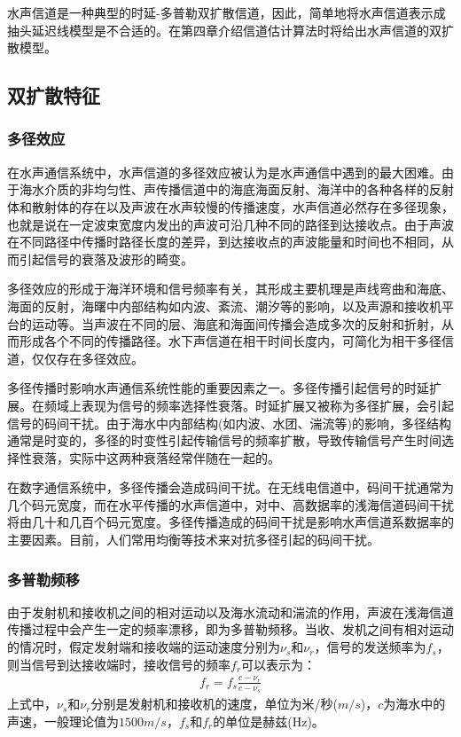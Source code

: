 水声信道是一种典型的时延-多普勒双扩散信道，因此，简单地将水声信道表示成抽头延迟线模型是不合适的。在第四章介绍信道估计算法时将给出水声信道的双扩散模型。
\subsection{双扩散特征}
\subsubsection*{多径效应}
在水声通信系统中，水声信道的多径效应被认为是水声通信中遇到的最大困难。由于海水介质的非均匀性、声传播信道中的海底海面反射、海洋中的各种各样的反射体和散射体的存在以及声波在水声较慢的传播速度，水声信道必然存在多径现象，也就是说在一定波束宽度内发出的声波可沿几种不同的路径到达接收点。由于声波在不同路径中传播时路径长度的差异，到达接收点的声波能量和时间也不相同，从而引起信号的衰落及波形的畸变。

多径效应的形成于海洋环境和信号频率有关，其形成主要机理是声线弯曲和海底、海面的反射，海曙中内部结构如内波、紊流、潮汐等的影响，以及声源和接收机平台的运动等。当声波在不同的层、海底和海面间传播会造成多次的反射和折射，从而形成各个不同的传播路径。水下声信道在相干时间长度内，可简化为相干多径信道，仅仅存在多径效应。

多径传播时影响水声通信系统性能的重要因素之一。多径传播引起信号的时延扩展。在频域上表现为信号的频率选择性衰落。时延扩展又被称为多径扩展，会引起信号的码间干扰。由于海水中内部结构(如内波、水团、湍流等)的影响，多径结构通常是时变的，多径的时变性引起传输信号的频率扩散，导致传输信号产生时间选择性衰落，实际中这两种衰落经常伴随在一起的。

在数字通信系统中，多径传播会造成码间干扰。在无线电信道中，码间干扰通常为几个码元宽度，而在水平传播的水声信道中，对中、高数据率的浅海信道码间干扰将由几十和几百个码元宽度。多径传播造成的码间干扰是影响水声信道系数据率的主要因素。目前，人们常用均衡等技术来对抗多径引起的码间干扰。
\subsubsection*{多普勒频移}
由于发射机和接收机之间的相对运动以及海水流动和湍流的作用，声波在浅海信道传播过程中会产生一定的频率漂移，即为多普勒频移。当收、发机之间有相对运动的情况时，假定发射端和接收端的运动速度分别为$\nu_s$和$\nu_r$，信号的发送频率为$f_s$，则当信号到达接收端时，接收信号的频率$f_r$可以表示为：
\begin{eqnarray}
    f_r=f_s\frac{c-\nu_r}{c-\nu_s}
    \label{equ:2.4}
\end{eqnarray}
上式中，$\nu_s$和$\nu_r$分别是发射机和接收机的速度，单位为米/秒($m/s$)，$c$为海水中的声速，一般理论值为$1500m/s$，$f_s$和$f_r$的单位是赫兹(Hz)。

